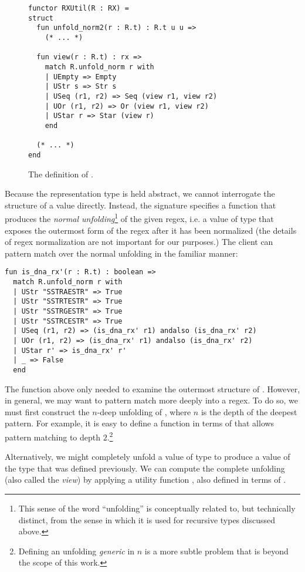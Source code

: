 \begin{figure}
\begin{lstlisting}[numbers=none]
functor RXUtil(R : RX) = 
struct
  fun unfold_norm2(r : R.t) : R.t u u => 
    (* ... *)

  fun view(r : R.t) : rx => 
    match R.unfold_norm r with 
    | UEmpty => Empty
    | UStr s => Str s
    | USeq (r1, r2) => Seq (view r1, view r2)
    | UOr (r1, r2) => Or (view r1, view r2)
    | UStar r => Star (view r)
    end 

  (* ... *)
end
\end{lstlisting}
\caption{The definition of .}
\label{fig:RXUtil}
\end{figure}

Because the representation type is held abstract, we cannot interrogate the structure of a value  directly. Instead, the signature specifies a function  that produces the \emph{normal unfolding}\footnote{This sense of the word ``unfolding'' is conceptually related to, but technically distinct, from the sense in which it is used for recursive types discussed above.} of the given regex, i.e. a value of type  that exposes the outermost form of the regex after it has been normalized (the details of regex normalization are not important for our purposes.) The client can pattern match over the {normal unfolding} in the familiar manner:
\begin{lstlisting}[numbers=none]
fun is_dna_rx'(r : R.t) : boolean => 
  match R.unfold_norm r with 
  | UStr "SSTRAESTR" => True
  | UStr "SSTRTESTR" => True
  | UStr "SSTRGESTR" => True
  | UStr "SSTRCESTR" => True
  | USeq (r1, r2) => (is_dna_rx' r1) andalso (is_dna_rx' r2)
  | UOr (r1, r2) => (is_dna_rx' r1) andalso (is_dna_rx' r2)
  | UStar r' => is_dna_rx' r'
  | _ => False
  end
\end{lstlisting}

The function above only needed to examine the outermost structure of . However, in general, we may want to pattern match more deeply into a regex. To do so, we must first construct the $n$-deep unfolding of , where $n$ is the depth of the deepest pattern. For example, it is easy to define a function  in terms of  that allows pattern matching to depth $2$.\footnote{Defining an unfolding \emph{generic} in $n$ is a more subtle problem that is beyond the scope of this work.} 

Alternatively, we might completely unfold a value of type  to produce a value of the type  that was defined previously. We can compute the complete unfolding (also called the \emph{view}) by applying a utility function , also defined in terms of .

